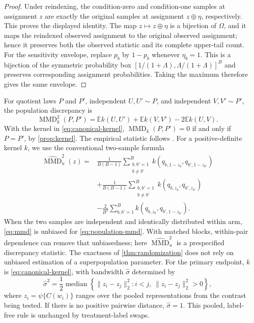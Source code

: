 \documentclass[11pt]{article}
\theoremstyle{definition}
\theoremstyle{remark}
\DeclareMathOperator{\MMD}{MMD}
\newcommand{\bE}{\mathbb E}
\newcommand{\1}{\mathbf 1}
\begin{document}
\begin{proof}
Under reindexing, the condition-zero and condition-one samples at assignment
\(z\) are exactly the original samples at assignment
\(z\mathbin\oplus\eta\), respectively.  This proves the displayed identity.
The map \(z\mapsto z\mathbin\oplus\eta\) is a bijection of \(\Omega\), and it
maps the reindexed observed assignment to the original observed assignment;
hence it preserves both the observed statistic and its complete upper-tail
count.  For the sensitivity envelope, replace \(p_b\) by \(1-p_b\) whenever
\(\eta_b=1\).  This is a bijection of the symmetric probability box
\([1/(1+\Lambda),\Lambda/(1+\Lambda)]^B\) and preserves corresponding
assignment probabilities.  Taking the maximum therefore gives the same
envelope.
\end{proof}

For quotient laws \(P\) and \(P'\), independent \(U,U'\sim P\), and
independent \(V,V'\sim P'\), the population discrepancy is
\begin{equation}\label{eq:population-mmd}
 \MMD_k^2(P,P')
 =
 \bE k(U,U')+\bE k(V,V')-2\bE k(U,V).
\end{equation}
With the kernel in \eqref{eq:canonical-kernel},
\(\MMD_k(P,P')=0\) if and only if \(P=P'\), by
\cref{prop:kernel}.  The empirical statistic follows
\citet{gretton2012kernel}.
For a positive-definite kernel \(k\), we use the conventional two-sample
formula
\begin{equation}\label{eq:mmd}
\begin{split}
\widehat{\MMD}_u^2(z)
={}&\frac{1}{B(B-1)}
 \sum_{\substack{b,b'=1\\b\ne b'}}^B
 k(q_{b,1-z_b},q_{b',1-z_{b'}})\\
&+\frac{1}{B(B-1)}
 \sum_{\substack{b,b'=1\\b\ne b'}}^B
 k(q_{b,z_b},q_{b',z_{b'}})\\
&-\frac{2}{B^2}\sum_{b,b'=1}^B
 k(q_{b,z_b},q_{b',1-z_{b'}}).
\end{split}
\end{equation}
When the two samples are independent and identically distributed within arm,
\eqref{eq:mmd} is unbiased for \eqref{eq:population-mmd}.  With matched blocks,
within-pair dependence can remove that unbiasedness; here
\(\widehat{\MMD}_u^2\) is a prespecified discrepancy statistic.  The exactness
of \cref{thm:randomization} does not rely on unbiased estimation of a
superpopulation parameter.
For the primary endpoint, \(k\) is \eqref{eq:canonical-kernel}, with bandwidth
\(\widehat\sigma\) determined by
\[
\widehat\sigma^2
=
\frac12\operatorname{median}
\left\{
\|z_i-z_j\|_2^2:
i<j,\ \|z_i-z_j\|_2^2>0
\right\},
\]
where \(z_i=\psi\{C(w_i)\}\) ranges over the pooled representations from the
contrast being tested.  If there is no positive pairwise distance,
\(\widehat\sigma=1\).  This pooled, label-free rule is unchanged by
treatment-label swaps.
\end{document}
